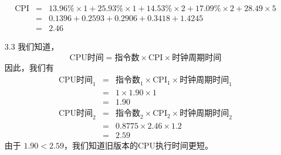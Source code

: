 \documentclass[UTF8,zihao=-4]{ctexart}
\begin{document}
\begin{itemize}
		\begin{eqnarray*}
			\text{CPI} &= &13.96\% \times 1 + 25.93\% \times 1 + 14.53\% \times 2 + 17.09\% \times 2 + 28.49 \times 5 \\
			&=& 0.1396 + 0.2593 + 0.2906 + 0.3418 + 1.4245 \\
			&=& 2.46
		\end{eqnarray*} 
		\item[3.3] 我们知道，
		\begin{equation*}
			\text{CPU时间}=\text{指令数}\times \text{CPI} \times \text{时钟周期时间}
		\end{equation*} 
		因此，我们有
		\begin{eqnarray*}
			\text{CPU时间}_1 &= &\text{指令数}_1\times \text{CPI}_1 \times \text{时钟周期时间}_1 \\
			&= &1 \times 1.90 \times 1 \\
			&= &1.90 \\
			\text{CPU时间}_2 &= &\text{指令数}_2\times \text{CPI}_2 \times \text{时钟周期时间}_2 \\
			&= &0.8775 \times 2.46 \times 1.2 \\
			&= &2.59
		\end{eqnarray*} 
		由于 $1.90 < 2.59$，我们知道旧版本的CPU执行时间更短。
	\end{itemize}
\end{document}
